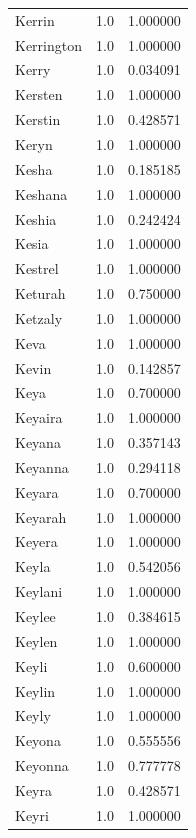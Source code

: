 \documentclass[
  letterpaper,
  DIV=11,
  numbers=noendperiod]{scrreprt}
\begin{document}
\begin{tabular}{lrr}
Kerrin          &   1.0 &   1.000000 \\
Kerrington      &   1.0 &   1.000000 \\
Kerry           &   1.0 &   0.034091 \\
Kersten         &   1.0 &   1.000000 \\
Kerstin         &   1.0 &   0.428571 \\
Keryn           &   1.0 &   1.000000 \\
Kesha           &   1.0 &   0.185185 \\
Keshana         &   1.0 &   1.000000 \\
Keshia          &   1.0 &   0.242424 \\
Kesia           &   1.0 &   1.000000 \\
Kestrel         &   1.0 &   1.000000 \\
Keturah         &   1.0 &   0.750000 \\
Ketzaly         &   1.0 &   1.000000 \\
Keva            &   1.0 &   1.000000 \\
Kevin           &   1.0 &   0.142857 \\
Keya            &   1.0 &   0.700000 \\
Keyaira         &   1.0 &   1.000000 \\
Keyana          &   1.0 &   0.357143 \\
Keyanna         &   1.0 &   0.294118 \\
Keyara          &   1.0 &   0.700000 \\
Keyarah         &   1.0 &   1.000000 \\
Keyera          &   1.0 &   1.000000 \\
Keyla           &   1.0 &   0.542056 \\
Keylani         &   1.0 &   1.000000 \\
Keylee          &   1.0 &   0.384615 \\
Keylen          &   1.0 &   1.000000 \\
Keyli           &   1.0 &   0.600000 \\
Keylin          &   1.0 &   1.000000 \\
Keyly           &   1.0 &   1.000000 \\
Keyona          &   1.0 &   0.555556 \\
Keyonna         &   1.0 &   0.777778 \\
Keyra           &   1.0 &   0.428571 \\
Keyri           &   1.0 &   1.000000 \\

\end{tabular}
\end{document}
